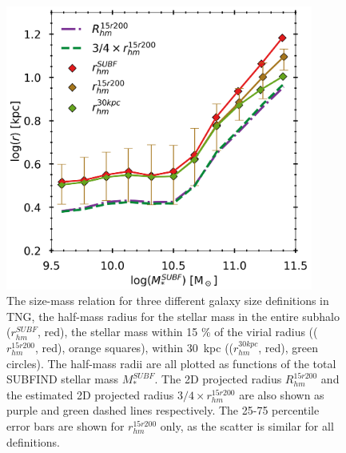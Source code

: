 \begin{figure}
    \centering
    \includegraphics[width=0.9\textwidth]{images/SM_R_tng.png}
    \caption{The size-mass relation for three different galaxy size definitions in TNG, the half-mass radius for the stellar mass in the entire subhalo ($r_{hm}^{SUBF}$, red), the stellar mass within 15 \% of the virial radius (($r_{hm}^{15r200}$, red), orange squares), within 30$\,$ kpc (($r_{hm}^{30kpc}$, red), green circles). The half-mass radii are all plotted as functions of the total SUBFIND stellar mass $M^{SUBF}_\ast$. The 2D projected radius $R_{hm}^{15r200}$ and the estimated 2D projected radius $3/4 \times r_{hm}^{15r200}$ are also shown as purple and green dashed lines respectively. The 25-75 percentile error bars are shown for $r^{15r200}_{hm}$ only, as the scatter is similar for all definitions.}
    \label{SM_R_TNG}
\end{figure}


